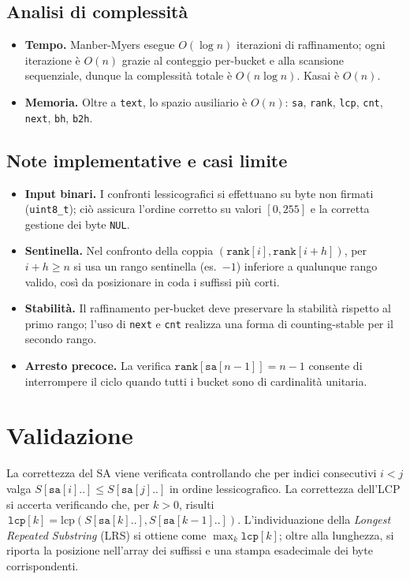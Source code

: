 		\subsection{Analisi di complessità}
			\begin{itemize}
				\item \textbf{Tempo.} Manber-Myers esegue $O(\log n)$ iterazioni di raffinamento; ogni iterazione è $O(n)$ grazie al conteggio per-bucket e alla scansione sequenziale, dunque la complessità totale è $O(n \log n)$. Kasai è $O(n)$.
				\item \textbf{Memoria.} Oltre a \texttt{text}, lo spazio ausiliario è $O(n)$: \texttt{sa}, \texttt{rank}, \texttt{lcp}, \texttt{cnt}, \texttt{next}, \texttt{bh}, \texttt{b2h}.
			\end{itemize}
		
		\subsection{Note implementative e casi limite}
			\begin{itemize}
				\item \textbf{Input binari.} I confronti lessicografici si effettuano su byte non firmati (\texttt{uint8\_t}); ciò assicura l'ordine corretto su valori $[0,255]$ e la corretta gestione dei byte \texttt{NUL}.
				\item \textbf{Sentinella.} Nel confronto della coppia $(\texttt{rank}[i], \texttt{rank}[i+h])$, per $i+h \ge n$ si usa un rango sentinella (es.\ $-1$) inferiore a qualunque rango valido, così da posizionare in coda i suffissi più corti.
				\item \textbf{Stabilità.} Il raffinamento per-bucket deve preservare la stabilità rispetto al primo rango; l'uso di \texttt{next} e \texttt{cnt} realizza una forma di counting-stable per il secondo rango.
				\item \textbf{Arresto precoce.} La verifica \mbox{$\texttt{rank}[\texttt{sa}[n-1]] = n-1$} consente di interrompere il ciclo quando tutti i bucket sono di cardinalità unitaria.
			\end{itemize}
	
	\section{Validazione}
		La correttezza del SA viene verificata controllando che per indici consecutivi $i<j$ valga $S[\texttt{sa}[i]..] \le S[\texttt{sa}[j]..]$ in ordine lessicografico.
		La correttezza dell'LCP si accerta verificando che, per $k>0$, risulti $\,\texttt{lcp}[k] = \text{lcp}(S[\texttt{sa}[k]..], S[\texttt{sa}[k-1]..])$.
		L'individuazione della \emph{Longest Repeated Substring} (LRS) si ottiene come $\max_k \texttt{lcp}[k]$; oltre alla lunghezza, si riporta la posizione nell'array dei suffissi e una stampa esadecimale dei byte corrispondenti.